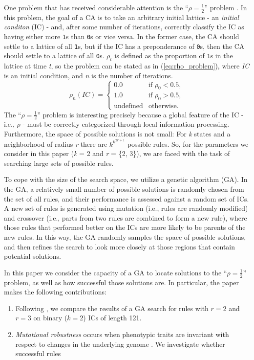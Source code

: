 One problem that has received considerable attention is the ``$\rho = \frac{1}{2}$'' problem \cite{Mitchell:1994:ECA:186092.186116}. In this problem, 
the goal of a CA is to take an arbitrary initial lattice - an \textit{initial conditon} (IC) - and, after some number of iterations, correctly classify the 
IC as having either more \texttt{1}s than \texttt{0}s or vice versa. In the former case, the CA should settle to a lattice of all 
\texttt{1}s, but if the IC has a preponderance of \texttt{0}s, then the CA should settle to a lattice of all \texttt{0}s. $\rho_t$ is defined as the proportion of 
\texttt{1}s in the lattice at time \textit{t}, so the problem can be stated as in (\ref{eq:rho_problem}), where \textit{IC} is an initial condition, and \textit{n} is the number of iterations.
\begin{equation} \label{eq:rho_problem}
  \rho_n(IC) =
  \begin{cases}
    0.0 & \text{if } \rho_0 < 0.5,
    \\
    1.0 & \text{if } \rho_0 > 0.5,
   \\
    \text{undefined} & \text{otherwise}.
  \end{cases}
\end{equation}
The ``$\rho = \frac{1}{2}$'' problem is interesting precisely because a global feature of the IC - i.e., $\rho$ - must be correctly categorized through  
local information processing. Furthermore, the space of possible solutions is not small: For \textit{k} states and a neighborhood of radius \textit{r} there are $k^{k^{2r+1}}$ possible rules. So, for the parameters we consider in this paper (\textit{k} = 2 and \textit{r} = \{2, 3\}), we are faced with the task of searching large sets of possible rules. 

To cope with the size of the search space, we utilize a genetic algorithm (GA). In the GA, a relatively small number of possible solutions is randomly chosen from 
the set of all rules, and their performance is assessed against a random set of ICs. A new set of rules is generated using mutation (i.e., rules are randomly modified) and crossover (i.e., parts from two rules are combined to form a new rule), where those rules that performed better on the ICs are more likely to be parents of the new rules. In this way, the GA randomly samples the space of possible solutions, and then refines the search to look more closely at those regions 
that contain potential solutions.

In this paper we consider the capacity of a GA to locate solutions to the ``$\rho = \frac{1}{2}$'' problem, as well as how successful those solutions are. In particular, the paper makes the following contributions: 
\begin{enumerate}
	\item Following \cite{Mitchell:1994:ECA:186092.186116}, we compare the results of a GA search for rules with $r = 2$ and $r = 3$ on binary ($k = 2$) 
	ICs of length 121.
	\item \textit{Mutational robustness} occurs when phenotypic traits are invariant with respect to changes in the underlying genome \cite{wagner_role_2012}.  
	We investigate whether successful rules 
\end{enumerate}
